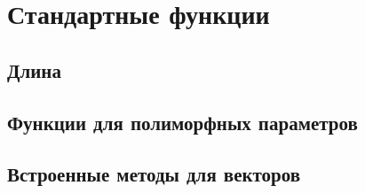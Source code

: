 \hypertarget{stdfuncs}{%
\section{Стандартные функции}\label{stdfuncs:chapter}}

\hypertarget{stdlen}{%
\subsection{Длина}\label{stdfuncs:stdlen}}

\hypertarget{stdpoly}{%
\subsection{Функции для полиморфных параметров}\label{stdfuncs:stdpoly}}

\hypertarget{stdvector}{%
\subsection{Встроенные методы для векторов}\label{stdfuncs:stdvector}}

